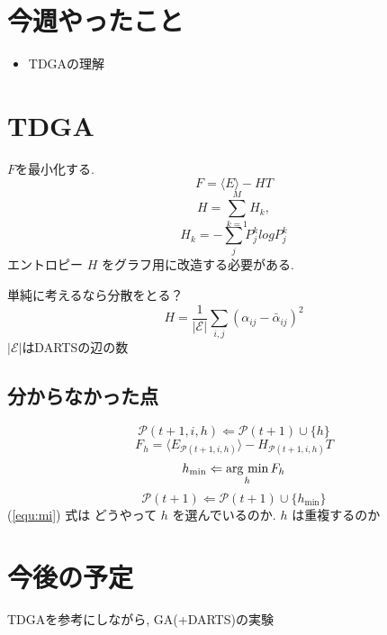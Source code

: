 \documentclass[twocolumn]{jarticle}     %
\newcommand{\argmin}{\mathop{\rm arg~min}\limits}
\begin{document}


\section{今週やったこと}
\begin{itemize}
  \item TDGAの理解
\end{itemize}

\section{TDGA}
$F$を最小化する.
\begin{equation}
  F = \langle E \rangle - HT
\end{equation}
\begin{equation}
  H = \sum^{M}_{k=1} H_k,
\end{equation}
\begin{equation}
  H_k = - \sum_{j} P^k_j log P^k_j
\end{equation}
エントロピー $H$ をグラフ用に改造する必要がある.

単純に考えるなら分散をとる？
\begin{equation}
  H = \frac{1}{|\mathcal{E}|} \sum_{i, j} ( \alpha_{ij} - \bar{\alpha}_{ij} )^2
\end{equation}
$|\mathcal{E}|$はDARTSの辺の数

\subsection{分からなかった点}
\begin{equation}
  \mathcal{P}(t+1, i, h) \Leftarrow \mathcal{P}(t+1) \cup \{h\}
\end{equation}
\begin{equation}
  F_h = \langle E_{\mathcal{P}(t+1, i, h)} \rangle - H_{\mathcal{P}(t+1, i, h)}T
\end{equation}
\begin{equation}
  \label{equ:mi}
  h_{\min} \Leftarrow \argmin_h F_h
\end{equation}
\begin{equation}
  \mathcal{P}(t+1) \Leftarrow \mathcal{P}(t+1) \cup \{h_{\min}\}
\end{equation}
(\ref{equ:mi}) 式は
どうやって $h$ を選んでいるのか.
$h$ は重複するのか

\section{今後の予定}
TDGAを参考にしながら, GA(+DARTS)の実験



\end{document}
